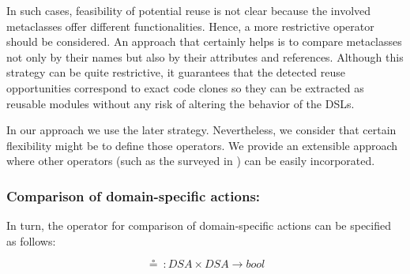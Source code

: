 In such cases, feasibility of potential reuse is not clear because the involved metaclasses offer different functionalities. Hence, a more restrictive operator should be considered. An approach that certainly helps is to compare metaclasses not only by their names but also by their attributes and references. Although this strategy can be quite restrictive, it guarantees that the detected reuse opportunities correspond to exact code clones so they can be extracted as reusable modules without any risk of altering the behavior of the DSLs.

In our approach we use the later strategy. Nevertheless, we consider that certain flexibility might be to define those operators. We provide an extensible approach where other operators (such as the surveyed in \cite{Lafi:2011}) can be easily incorporated.



\vspace{-3mm}
\subsubsection{Comparison of domain-specific actions:} In turn, the operator for comparison of domain-specific actions can be specified as follows:

\begin{equation}
  \circeq~: DSA \times DSA \rightarrow bool
\end{equation}

